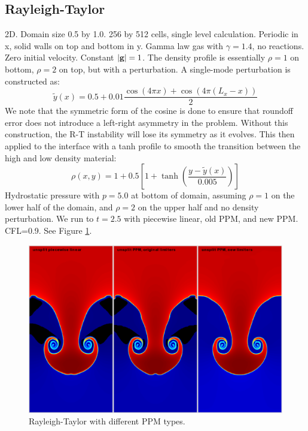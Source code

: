 \subsection{Rayleigh-Taylor}
2D.  Domain size 0.5 by 1.0.  256 by 512 cells, single level
calculation.  Periodic in x, solid walls on top and bottom in y.
Gamma law gas with $\gamma=1.4$, no reactions.  Zero initial velocity.
Constant $|{\bf g}|=1$.  The density profile is essentially $\rho=1$ on
bottom, $\rho=2$ on top, but with a perturbation.  A single-mode
perturbation is constructed as:
\begin{equation}
\tilde y(x) = 0.5 + 0.01 \frac{\cos(4\pi x) + \cos(4\pi(L_x - x))}{2}
\end{equation}
We note that the symmetric form of the cosine is done to ensure that 
roundoff error does not introduce a left-right asymmetry in the problem.
Without this construction, the R-T instability will lose its symmetry
as it evolves.  This then applied to the interface with a tanh profile
to smooth the transition between the high and low density material:
\begin{equation}
\rho(x,y) = 1 + 0.5\left[1+\tanh\left(\frac{y-\tilde y(x)}{0.005}\right)\right]
\end{equation}
Hydrostatic pressure with $p=5.0$ at bottom of domain, assuming
$\rho=1$ on the lower half of the domain, and $\rho=2$ on the upper
half and no density perturbation.  We run to $t=2.5$ with piecewise
linear, old PPM, and new PPM.  CFL=0.9.  See Figure \ref{fig:RT}.
\begin{figure}[h]
\centering
\includegraphics[width=6.5in]{RT_ppm_type}
\caption{\label{fig:RT}Rayleigh-Taylor with different PPM types.}
\end{figure}

